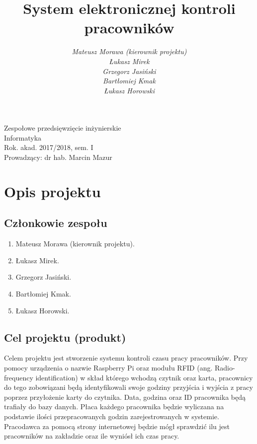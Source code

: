 \documentclass[a4paper]{article}
\title{\bf{System elektronicznej kontroli pracowników}}
\author{{\em Mateusz Morawa (kierownik projektu)}\\
{\em Łukasz Mirek}\\
{\em Grzegorz Jasiński}\\
{\em Bartłomiej Kmak}\\
{\em Łukasz Horowski}\\
}
\date{}
\begin{document}
\begin{titlepage}
\maketitle
\thispagestyle{empty}
\bigskip
\begin{center}
Zespołowe przedsięwzięcie inżynierskie\\[2mm]

Informatyka\\[2mm]

Rok. akad. 2017/2018, sem. I\\[2mm]

Prowadzący: dr hab. Marcin Mazur
\end{center}
\end{titlepage}

\tableofcontents
\thispagestyle{empty}

\newpage

\section{Opis projektu}

\subsection{Członkowie zespołu}

\begin{enumerate}
\item Mateusz Morawa (kierownik projektu).
\item Łukasz Mirek.
\item Grzegorz Jasiński.
\item Bartłomiej Kmak.
\item Łukasz Horowski.
\end{enumerate}

\subsection{Cel projektu (produkt)}

Celem projektu jest stworzenie systemu kontroli czasu pracy pracowników. Przy pomocy urządzenia o nazwie Raspberry Pi oraz modułu RFID (ang. Radio-frequency identification) w skład którego wchodzą czytnik oraz karta, pracownicy do tego zobowiązani będą identyfikowali swoje godziny przyjścia i wyjścia z pracy poprzez przyłożenie karty do czytnika. Data, godzina oraz ID pracownika będą trafiały do bazy danych. Płaca każdego pracownika będzie wyliczana na podstawie ilości przepracowanych godzin zarejestrowanych w systemie. Pracodawca za pomocą strony internetowej będzie mógł sprawdzić ilu jest pracowników na zakładzie oraz ile wyniósł ich czas pracy.
\end{document}
